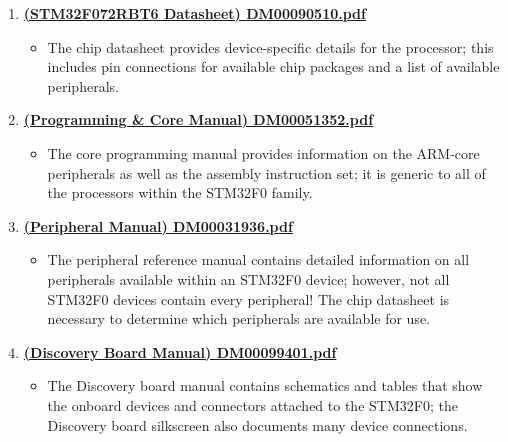 \documentclass[openany,11pt,fleqn]{book} %
\begin{document}
\begin{enumerate}
    \item \href{http://www.st.com/content/ccc/resource/technical/document/datasheet/cd/46/43/83/22/d3/40/c8/DM00090510.pdf/files/DM00090510.pdf/jcr:content/translations/en.DM00090510.pdf}{\textbf{(STM32F072RBT6 Datasheet) DM00090510.pdf}}
    \begin{itemize}
        \item The chip datasheet provides device-specific details for the processor; this includes pin connections for available chip packages and a list of available peripherals.
    \end{itemize}
    \item
    \href{http://www.st.com/content/ccc/resource/technical/document/programming_manual/fc/90/c7/17/a1/44/43/89/DM00051352.pdf/files/DM00051352.pdf/jcr:content/translations/en.DM00051352.pdf}{\textbf{(Programming \& Core Manual) DM00051352.pdf}}
    \begin{itemize}
        \item The core programming manual provides information on the ARM-core peripherals as well as the assembly instruction set; it is generic to all of the processors within the STM32F0 family.
    \end{itemize}
    \item
    \href{http://www.st.com/content/ccc/resource/technical/document/reference_manual/c2/f8/8a/f2/18/e6/43/96/DM00031936.pdf/files/DM00031936.pdf/jcr:content/translations/en.DM00031936.pdf}{\textbf{(Peripheral Manual) DM00031936.pdf}}
    \begin{itemize}
        \item The peripheral reference manual contains detailed information on all peripherals available within an STM32F0 device; however, not all STM32F0 devices contain every peripheral! The chip datasheet is necessary to determine which peripherals are available for use.
    \end{itemize}
    \item 
    \href{http://www.st.com/content/ccc/resource/technical/document/user_manual/3b/8d/46/57/b7/a9/49/b4/DM00099401.pdf/files/DM00099401.pdf/jcr:content/translations/en.DM00099401.pdf}{\textbf{(Discovery Board Manual) DM00099401.pdf}}
    \begin{itemize}
        \item The Discovery board manual contains schematics and tables that show the onboard devices and connectors attached to the STM32F0; the Discovery board silkscreen also documents many device connections. 
    \end{itemize}
\end{enumerate}
\end{document}
